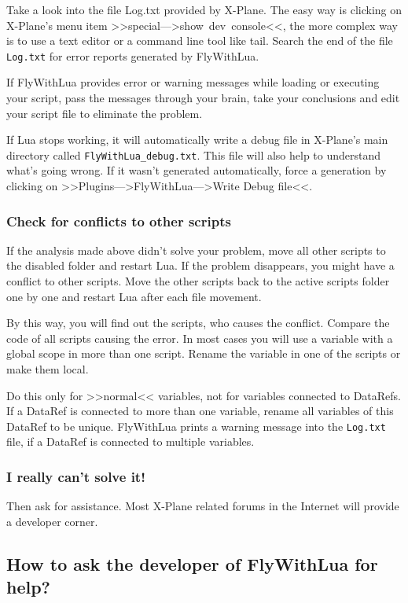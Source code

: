 \documentclass[11pt,parskip=half,a4paper]{scrartcl}
\begin{document}
Take a look into the file Log.txt provided by X-Plane. The easy way is clicking on X-Plane's menu item >>special--->show~dev~console<<, the more complex way is to use a text editor or a command line tool like tail. Search the end of the file \verb|Log.txt| for error reports generated by FlyWithLua.

If FlyWithLua provides error or warning messages while loading or executing your script, pass the messages through your brain, take your conclusions and edit your script file to eliminate the problem.

If Lua stops working, it will automatically write a debug file in X-Plane's main directory called \verb|FlyWithLua_debug.txt|. This file will also help to understand what's going wrong. If it wasn't generated automatically, force a generation by clicking on >>Plugins--->FlyWithLua--->Write Debug file<<.

\subsubsection{Check for conflicts to other scripts}

If the analysis made above didn't solve your problem, move all other scripts to the disabled folder and restart Lua. If the problem disappears, you might have a conflict to other scripts. Move the other scripts back to the active scripts folder one by one and restart Lua after each file movement. 

By this way, you will find out the scripts, who causes the conflict. Compare the code of all scripts causing the error. In most cases you will use a variable with a global scope in more than one script. Rename the variable in one of the scripts or make them local.

Do this only for >>normal<< variables, not for variables connected to DataRefs. If a DataRef is connected to more than one variable, rename all variables of this DataRef to be unique. FlyWithLua prints a warning message into the \verb|Log.txt| file, if a DataRef is connected to multiple variables.

\subsubsection{I really can't solve it!}

Then ask for assistance. Most X-Plane related forums in the Internet will provide a developer corner.

\subsection{How to ask the developer of FlyWithLua for help?}
\end{document}
